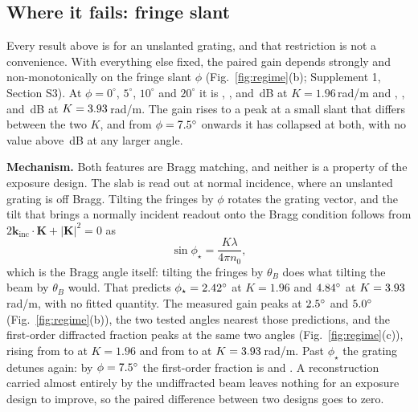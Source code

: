 \documentclass{optica-article}
\begin{document}
\subsection{Where it fails: fringe slant}
\label{sec:slant}
Every result above is for an unslanted grating, and that restriction is not a
convenience. With everything else fixed, the paired gain depends strongly and
non-monotonically on the fringe slant $\phi$ (Fig.~\ref{fig:regime}(b);
Supplement 1, Section S3). At $\phi=0^\circ$, $5^\circ$, $10^\circ$ and
$20^\circ$ it is \SEightGainKLowSlantZero, \SEightGainKLowSlantFive,
\SEightGainKLowSlantTen{} and \SEightGainKLowSlantTwenty\,dB at
$K=1.96$\,rad/\textmu m and \SEightGainKMidSlantZero,
\SEightGainKMidSlantFive, \SEightGainKMidSlantTen{} and
\SEightGainKMidSlantTwenty\,dB at $K=3.93$\,rad/\textmu m. The gain rises
to a peak at a small slant that differs between the two $K$, and from
$\phi=7.5^\circ$ onwards it has collapsed at both, with no value
above \SlantMaxGainBeyondCollapse\,dB at any larger angle.

\textbf{Mechanism.} Both features are Bragg matching, and neither is a property
of the exposure design. The slab is read out at normal incidence, where an
unslanted grating is off Bragg. Tilting the fringes by $\phi$ rotates the
grating vector, and the tilt that brings a normally incident readout onto the
Bragg condition follows from $2\mathbf{k}_{\text{inc}}\!\cdot\!\mathbf{K}+|\mathbf{K}|^2=0$ as
\begin{equation}
\label{eq:bragg-slant}
\sin\phi_\star=\frac{K\lambda}{4\pi n_0},
\end{equation}
which is the Bragg angle itself: tilting the fringes by $\theta_B$ does what
tilting the beam by $\theta_B$ would. That predicts
$\phi_\star=2.42^\circ$ at $K=1.96$ and
$4.84^\circ$ at $K=3.93$\,rad/\textmu m, with no fitted
quantity. The measured gain peaks at $2.5^\circ$ and
$5.0^\circ$ (Fig.~\ref{fig:regime}(b)), the two tested angles
nearest those predictions, and the first-order diffracted fraction peaks at the
same two angles (Fig.~\ref{fig:regime}(c)), rising from \BPMKLowZeroEta{} to
\BPMKLowPeakEta{} at $K=1.96$ and from \BPMKMidZeroEta{} to \BPMKMidPeakEta{}
at $K=3.93$\,rad/\textmu m. Past $\phi_\star$ the grating detunes again:
by $\phi=7.5^\circ$ the first-order fraction is
\BPMKLowSevenFiveEta{} and \BPMKMidSevenFiveEta. A reconstruction carried
almost entirely by the undiffracted beam leaves nothing for an exposure design
to improve, so the paired difference between two designs goes to zero.
\end{document}
